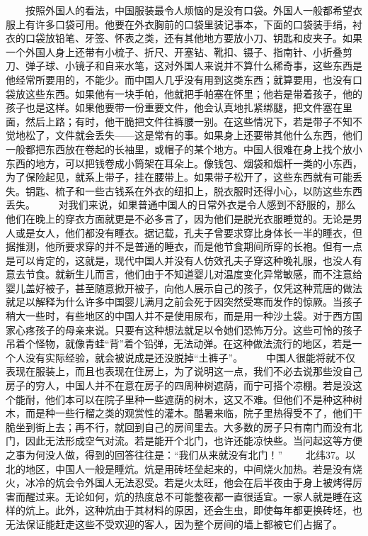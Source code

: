 \documentclass[12pt,oneside]{book}
\begin{document}
\begin{common-format}
　　按照外国人的看法，中国服装最令人烦恼的是没有口袋。外国人一般都希望衣服上有许多口袋可用。他要在外衣胸前的口袋里装记事本，下面的口袋装手绢，衬衣的口袋放铅笔、牙签、怀表之类，还有其他地方要放小刀、钥匙和皮夹子。如果一个外国人身上还带有小梳子、折尺、开塞钻、靴扣、镊子、指南针、小折叠剪刀、弹子球、小镜子和自来水笔，这对外国人来说并不算什么稀奇事，这些东西是他经常所要用的，不能少。而中国人几乎没有用到这类东西；就算要用，也没有口袋放这些东西。如果他有一块手帕，他就把手帕塞在怀里；他若是带着孩子，他的孩子也是这样。如果他要带一份重要文件，他会认真地扎紧绑腿，把文件塞在里面，然后上路；有时，他干脆把文件往裤腰一别。在这些情况下，若是带子不知不觉地松了，文件就会丢失——这是常有的事。如果身上还要带其他什么东西，他们一般都把东西放在卷起的长袖里，或帽子的某个地方。中国人很难在身上找个放小东西的地方，可以把钱卷成小筒架在耳朵上。像钱包、烟袋和烟杆一类的小东西，为了保险起见，就系上带子，挂在腰带上。如果带子松开了，这些东西就有可能丢失。钥匙、梳子和一些古钱系在外衣的纽扣上，脱衣服时还得小心，以防这些东西丢失。 
　　对我们来说，如果普通中国人的日常外衣是令人感到不舒服的，那么他们在晚上的穿衣方面就更是不必多言了，因为他们是脱光衣服睡觉的。无论是男人或是女人，他们都没有睡衣。据记载，孔夫子曾要求穿比身体长一半的睡衣，但据推测，他所要求穿的并不是普通的睡衣，而是他节食期间所穿的长袍。但有一点是可以肯定的，这就是，现代中国人并没有人仿效孔夫子穿这种晚礼服，也没人有意去节食。就新生儿而言，他们由于不知道婴儿对温度变化异常敏感，而不注意给婴儿盖好被子，甚至随意掀开被子，向他人展示自己的孩子，仅凭这种荒唐的做法就足以解释为什么许多中国婴儿满月之前会死于因突然受寒而发作的惊厥。当孩子稍大一些时，有些地区的中国人并不是使用尿布，而是用一种沙土袋。对于西方国家心疼孩子的母亲来说。只要有这种想法就足以令她们恐怖万分。这些可怜的孩子吊着个怪物，就像青蛙“背”着个铅弹，无法动弹。在这种做法流行的地区，若是一个人没有实际经验，就会被说成是还没脱掉“土裤子”。 
　　中国人很能将就不仅表现在服装上，而且也表现在住房上，为了说明这一点，我们不必去说那些没自己房子的穷人，中国人并不在意在房子的四周种树遮荫，而宁可搭个凉棚。若是没这个能耐，他们本可以在院子里种一些遮荫的树木，这又不难。但他们不是种这种树木，而是种一些行榴之类的观赏性的灌木。酷暑来临，院子里热得受不了，他们干脆坐到街上去；再不行，就回到自己的房间里去。大多数的房子只有南门而没有北门，因此无法形成空气对流。若是能开个北门，也许还能凉快些。当问起这等方便之事为何没人做，得到的回答往往是：“我们从来就没有北门！” 
　　北纬37。以北的地区，中国人一般是睡炕。炕是用砖坯垒起来的，中间烧火加热。若是没有烧火，冰冷的炕会令外国人无法忍受。若是火太旺，他会在后半夜由于身上被烤得厉害而醒过来。无论如何，炕的热度总不可能整夜都一直很适宜。一家人就是睡在这样的炕上。此外，这种炕由于其材料的原因，还会生虫，即使每年都更换砖坯，也无法保证能赶走这些不受欢迎的客人，因为整个房间的墙上都被它们占据了。 

\end{common-format}
\end{document}
